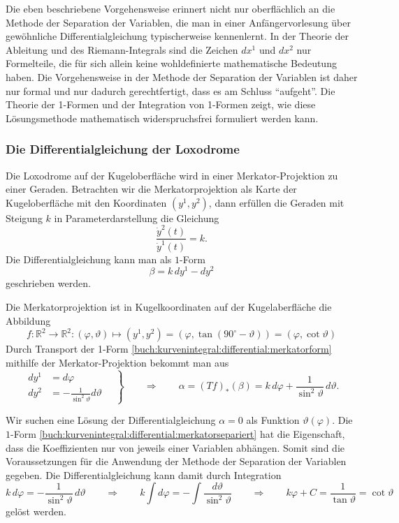 Die eben beschriebene Vorgehensweise erinnert nicht nur oberflächlich
an die Methode der Separation der Variablen, die man in einer
Anfängervorlesung über gewöhnliche Differentialgleichung typischerweise
kennenlernt.
In der Theorie der Ableitung und des Riemann-Integrals sind die Zeichen
$dx^1$ und $dx^2$ nur Formelteile, die für sich allein keine
wohldefinierte mathematische Bedeutung haben.
Die Vorgehensweise in der Methode der Separation der Variablen ist
daher nur formal und nur dadurch gerechtfertigt, dass es am Schluss
``aufgeht''.
Die Theorie der 1-Formen und der Integration von 1-Formen zeigt,
wie diese Lösungsmethode mathematisch widerspruchsfrei formuliert
werden kann.

\subsubsection{Die Differentialgleichung der Loxodrome}
Die Loxodrome auf der Kugeloberfläche wird in einer Merkator-Projektion
zu einer Geraden.
Betrachten wir die Merkatorprojektion als Karte der Kugeloberfläche
mit den Koordinaten $(y^1,y^2)$, dann erfüllen die Geraden mit
Steigung $k$ in Parameterdarstellung die Gleichung
\[
\frac{\dot{y}^2(t)}{\dot{y}^1(t)}
=
k.
\]
Die Differentialgleichung kann man als $1$-Form 
\begin{equation}
\beta
=
k\,dy^1 - dy^2
\label{buch:kurvenintegral:differential:merkatorform}
\end{equation}
geschrieben werden.

Die Merkatorprojektion ist in Kugelkoordinaten auf der Kugelaberfläche
die Abbildung
\[
f\colon
\mathbb{R}^2\to\mathbb{R}^2
:
(\varphi,\vartheta)
\mapsto
(y^1,y^2)
=
(\varphi,\tan(90^\circ-\vartheta))
=
(\varphi,\cot\vartheta)
\]
Durch Transport der 1-Form
\eqref{buch:kurvenintegral:differential:merkatorform}
mithilfe der Merkator-Projektion bekommt man aus
\begin{equation}
\left.
\begin{aligned}
dy^1 &= d\varphi \\
dy^2 &= -\frac{1}{\sin^2\vartheta}d\vartheta
\end{aligned}
\quad
\right\}
\qquad
\Rightarrow
\qquad
\alpha
=
(Tf)_*(\beta)
=
k\,d\varphi+\frac{1}{\sin^2\vartheta}\,d\vartheta.
\label{buch:kurvenintegral:differential:merkatorsepariert}
\end{equation}

Wir suchen eine Lösung der Differentialgleichung $\alpha=0$
als Funktion $\vartheta(\varphi)$.
Die $1$-Form
\eqref{buch:kurvenintegral:differential:merkatorsepariert}
hat die Eigenschaft, dass die Koeffizienten nur von jeweils
einer Variablen abhängen.
Somit sind die Voraussetzungen für die Anwendung der Methode
der Separation der Variablen gegeben.
Die Differentialgleichung kann damit durch Integration
\[
k\,d\varphi=-\frac{1}{\sin^2\vartheta}\,d\vartheta
\qquad
\Rightarrow
\qquad
k\int d\varphi
=-
\int \frac{d\vartheta}{\sin^2\vartheta}
\qquad
\Rightarrow
\qquad
k\varphi + C
=
\frac{1}{\tan \vartheta}
=
\cot\vartheta
\]
gelöst werden.

